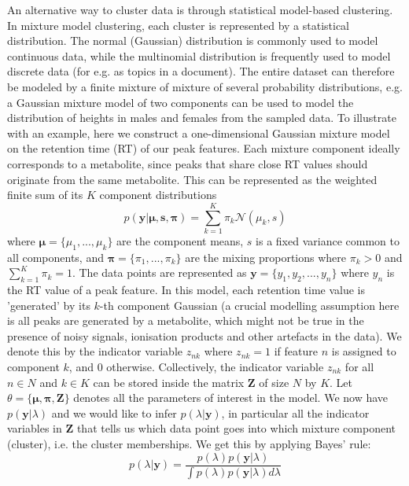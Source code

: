 An alternative way to cluster data is through statistical model-based clustering. In mixture model clustering, each cluster is represented by a statistical distribution. The normal (Gaussian) distribution is commonly used to model continuous data, while the multinomial distribution is frequently used to model discrete data (for e.g. as topics in a document). The entire dataset can therefore be modeled by a finite mixture of mixture of several probability distributions, e.g. a Gaussian mixture model of two components can be used to model the distribution of heights in males and females from the sampled data. To illustrate with an example, here we construct a one-dimensional Gaussian mixture model on the retention time (RT) of our peak features. Each mixture component ideally corresponds to a metabolite, since peaks that share close RT values should originate from the same metabolite. This can be represented as the weighted finite sum of its $K$ component distributions
\begin{equation}
p(\mathbf{y}|\boldsymbol{\mu},\boldsymbol{s},\boldsymbol{\pi})=\sum_{k=1}^{K}\pi_{k}\mathcal{{N}}(\mu_{k},s)
\end{equation}
where $\boldsymbol{\mu}=\{\mu_{1},...,\mu_{k}\}$ are the component means, $s$ is a fixed variance common to all components, and $\boldsymbol{\pi}=\{\pi_{1},...,\pi_{k}\}$ are the mixing proportions where $\pi_{k}>0$ and $\sum_{k=1}^{K}\pi_{k}=1$. The data points are represented as $\boldsymbol{y}=\{y_{1},y_{2},...,y_{n}\}$ where $y_{n}$ is the RT value of a peak feature. In this model, each retention time value is 'generated' by its $k$-th component Gaussian (a crucial modelling assumption here is all peaks are generated by a metabolite, which might not be true in the presence of noisy signals, ionisation products and other artefacts in the data). We denote this by the indicator variable $z_{nk}$ where $z_{nk}=1$ if feature $n$ is assigned to component $k$, and 0 otherwise. Collectively, the indicator variable $z_{nk}$ for all $n\in N$ and $k\in K$ can be stored inside the matrix $\mathbf{Z}$ of size $N$ by $K$. Let $\theta=\{\boldsymbol{\mu},\boldsymbol{\pi},\mathbf{Z}\}$ denotes all the parameters of interest in the model. We now have $p(\boldsymbol{y}|\lambda)$ and we would like to infer $p(\lambda|\boldsymbol{y})$, in particular all the indicator variables in $\mathbf{Z}$ that tells us which data point goes into which mixture component (cluster), i.e. the cluster memberships. We get this by applying Bayes' rule: 
\begin{equation}
p(\lambda|\boldsymbol{y})=\frac{p(\lambda)p(\boldsymbol{y}|\lambda)}{\int p(\lambda)p(\boldsymbol{y}|\lambda)d\lambda}
\end{equation}
